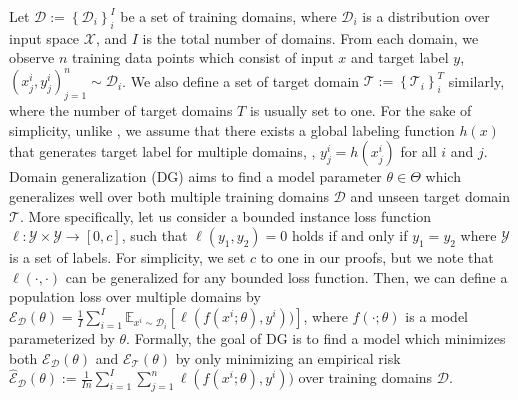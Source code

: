 

Let $\mathcal{D}:=\left\{\mathcal{D}_{i}\right\}_{i}^{I}$ be a set of training domains, where $\mathcal{D}_{i}$ is a distribution over input space $\mathcal{X}$, and $I$ is the total number of domains. From each domain, we observe $n$ training data points which consist of input $x$ and target label $y$, $(x_{j}^{i},y_{j}^{i})_{j=1}^{n}\sim\mathcal{D}_{i}$.
We also define a set of target domain $\mathcal{T}:=\left\{\mathcal{T}_{i}\right\}_{i}^{T}$ similarly, where the number of target domains $T$ is usually set to one.
For the sake of simplicity, unlike \citet{ben2010theory},
we assume that there exists a global labeling function $h(x)$ that generates target label for multiple domains, \ie, $y_{j}^{i}=h(x_{j}^{i})$ for all $i$ and $j$.
Domain generalization (DG) aims to find a model parameter $\theta \in \Theta$ which generalizes well over both multiple training domains $\mathcal{D}$ and unseen target domain $\mathcal{T}$.
More specifically, let us consider a bounded instance loss function $\ell:\mathcal{Y}\times\mathcal{Y} \rightarrow [0, c]$,
such that $\ell(y_{1},y_{2})=0$ holds if and only if $y_{1}=y_{2}$ where $\mathcal{Y}$ is a set of labels.
For simplicity, we set $c$ to one in our proofs, but we note that $\ell(\cdot,\cdot)$ can be generalized for any bounded loss function.
Then, we can define a population loss over multiple domains by $\mathcal{E}_{\mathcal{D}}(\theta)=\frac{1}{I}\sum_{i=1}^{I}\mathbb{E}_{x^{i}\sim\mathcal{D}_{i}}[\ell(f(x^{i};\theta), y^{i}))]$, where $f(\cdot;\theta)$ is a model parameterized by $\theta$.
Formally, the goal of DG is to find a model which minimizes both $\mathcal{E}_{\mathcal{D}}(\theta)$ and $\mathcal{E}_{\mathcal{T}}(\theta)$ by only minimizing an empirical risk $\hat{\mathcal{E}}_{\mathcal{D}}(\theta):=\frac{1}{In}\sum_{i=1}^{I}\sum_{j=1}^{n}\ell(f(x^{i};\theta), y^{i}))$ over training domains $\mathcal D$.

